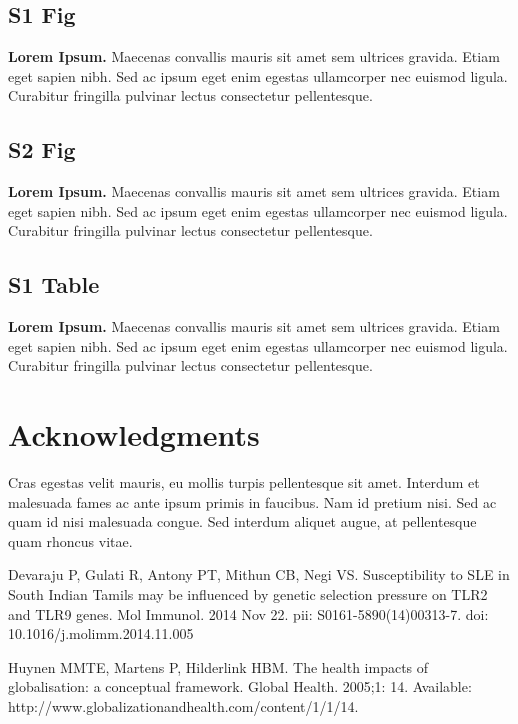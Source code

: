 \documentclass[10pt,letterpaper]{article}
\begin{document}
\subsection*{S1 Fig}
\label{S1_Fig}
{\bf Lorem Ipsum.} Maecenas convallis mauris sit amet sem ultrices gravida. Etiam eget sapien nibh. Sed ac ipsum eget enim egestas ullamcorper nec euismod ligula. Curabitur fringilla pulvinar lectus consectetur pellentesque.

\subsection*{S2 Fig}
\label{S2_Fig}
{\bf Lorem Ipsum.} Maecenas convallis mauris sit amet sem ultrices gravida. Etiam eget sapien nibh. Sed ac ipsum eget enim egestas ullamcorper nec euismod ligula. Curabitur fringilla pulvinar lectus consectetur pellentesque.

\subsection*{S1 Table}
\label{S1_Table}
{\bf Lorem Ipsum.} Maecenas convallis mauris sit amet sem ultrices gravida. Etiam eget sapien nibh. Sed ac ipsum eget enim egestas ullamcorper nec euismod ligula. Curabitur fringilla pulvinar lectus consectetur pellentesque.

\section*{Acknowledgments}
Cras egestas velit mauris, eu mollis turpis pellentesque sit amet. Interdum et malesuada fames ac ante ipsum primis in faucibus. Nam id pretium nisi. Sed ac quam id nisi malesuada congue. Sed interdum aliquet augue, at pellentesque quam rhoncus vitae.

\nolinenumbers

%
%
% 
\begin{thebibliography}{10}
Devaraju P, Gulati R, Antony PT, Mithun CB, Negi VS. Susceptibility to SLE in South Indian Tamils may be influenced by genetic selection pressure on TLR2 and TLR9 genes. Mol Immunol. 2014 Nov 22. pii: S0161-5890(14)00313-7. doi: 10.1016/j.molimm.2014.11.005

Huynen MMTE, Martens P, Hilderlink HBM. The health impacts of globalisation: a conceptual framework. Global Health. 2005;1: 14. Available: http://www.globalizationandhealth.com/content/1/1/14.

\end{thebibliography}
\end{document}
